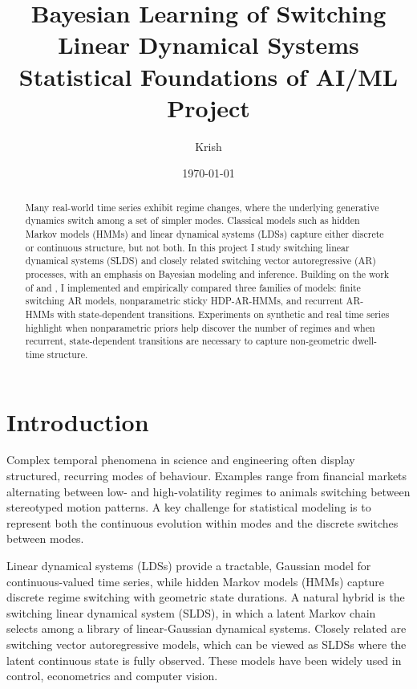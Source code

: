 \documentclass[11pt]{article}
\title{Bayesian Learning of Switching Linear Dynamical Systems\\
  \large Statistical Foundations of AI/ML Project}
\author{Krish}
\date{\today}
\begin{document}
\maketitle

\begin{abstract}
Many real-world time series exhibit regime changes, where the underlying
generative dynamics switch among a set of simpler modes. Classical models
such as hidden Markov models (HMMs) and linear dynamical systems (LDSs)
capture either discrete or continuous structure, but not both. In this
project I study switching linear dynamical systems (SLDS) and closely
related switching vector autoregressive (AR) processes, with an emphasis
on Bayesian modeling and inference. Building on the work of
\citet{fox2008} and \citet{linderman2017}, I implemented and empirically
compared three families of models: finite switching AR models,
nonparametric sticky HDP-AR-HMMs, and recurrent AR-HMMs with
state-dependent transitions. Experiments on synthetic and real time
series highlight when nonparametric priors help discover the number of
regimes and when recurrent, state-dependent transitions are necessary to
capture non-geometric dwell-time structure.
\end{abstract}

\section{Introduction}

Complex temporal phenomena in science and engineering often display
structured, recurring modes of behaviour. Examples range from financial
markets alternating between low- and high-volatility regimes to animals
switching between stereotyped motion patterns. A key challenge for
statistical modeling is to represent both the continuous evolution
within modes and the discrete switches between modes.

Linear dynamical systems (LDSs) provide a tractable, Gaussian model for
continuous-valued time series, while hidden Markov models (HMMs) capture
discrete regime switching with geometric state durations. A natural
hybrid is the switching linear dynamical system (SLDS), in which a
latent Markov chain selects among a library of linear-Gaussian dynamical
systems. Closely related are switching vector autoregressive models,
which can be viewed as SLDSs where the latent continuous state is fully
observed. These models have been widely used in control, econometrics
and computer vision.
\end{document}
